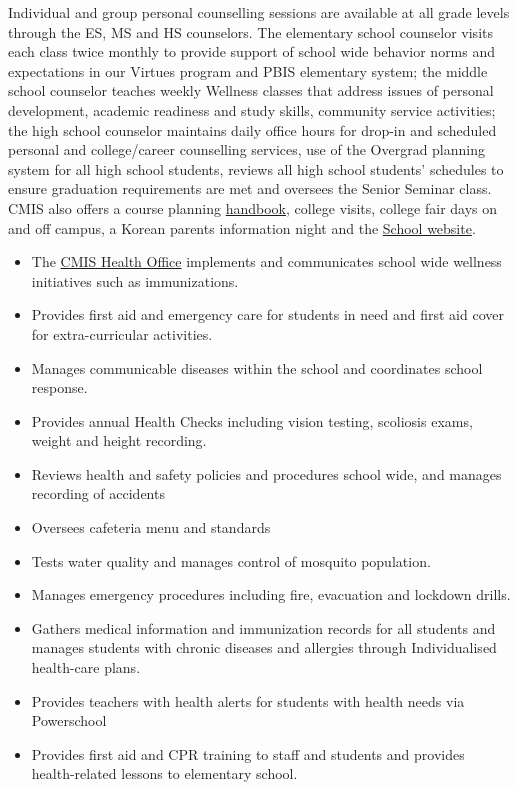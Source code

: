 \begin{findings}
Individual and group personal counselling sessions are available at all grade levels through the ES, MS and HS counselors. The elementary school counselor visits each class twice monthly to provide support of school wide behavior norms and expectations in our Virtues program and PBIS elementary system; the middle school counselor teaches weekly Wellness classes that address issues of personal development, academic readiness and study skills, community service activities; the high school counselor maintains daily office hours for drop-in and scheduled personal and college/career counselling services, use of the Overgrad planning system for all high school students, reviews all high school students’ schedules to ensure graduation requirements are met and oversees the Senior Seminar class. CMIS also offers a course planning \href{https://docs.google.com/document/d/16eIB9M_ucfMOXqUCxWzIenWzrnKBg2kegjcK8XHlTqI/edit#heading=h.6sft8ugn206j}{handbook}, college visits, college fair days on and off campus, a Korean parents information night and the \href{http://cmis.ac.th/}{School website}.

\begin{itemize}
\item The \href{https://sites.google.com/a/cmis.ac.th/cmis-health-office/home}{CMIS Health Office} implements and communicates school wide wellness initiatives such as immunizations.
\item Provides first aid and emergency care for students in need and first aid cover for extra-curricular activities.
\item Manages communicable diseases within the school and coordinates school response. 
\item Provides annual Health Checks including vision testing, scoliosis exams, weight and height recording. 
\item Reviews health and safety policies and procedures school wide, and manages recording of accidents
\item Oversees cafeteria menu and standards 
\item Tests water quality and manages control of mosquito population. 
\item Manages emergency procedures including fire, evacuation and lockdown drills.
\item Gathers medical information and immunization records for all students and manages students with chronic diseases and allergies through Individualised health-care plans.
\item Provides teachers with health alerts for students with health needs via Powerschool
\item Provides first aid and CPR training to staff and students and provides health-related lessons to elementary school.
\end{itemize}
 

\end{findings}
